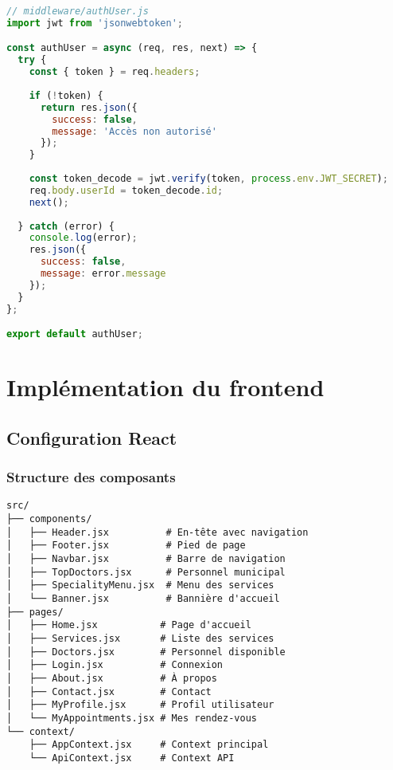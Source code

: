 \begin{lstlisting}[language=JavaScript, caption=Middleware d'authentification]
// middleware/authUser.js
import jwt from 'jsonwebtoken';

const authUser = async (req, res, next) => {
  try {
    const { token } = req.headers;
    
    if (!token) {
      return res.json({
        success: false,
        message: 'Accès non autorisé'
      });
    }
    
    const token_decode = jwt.verify(token, process.env.JWT_SECRET);
    req.body.userId = token_decode.id;
    next();
    
  } catch (error) {
    console.log(error);
    res.json({
      success: false,
      message: error.message
    });
  }
};

export default authUser;
\end{lstlisting}

\section{Implémentation du frontend}

\subsection{Configuration React}

\subsubsection{Structure des composants}

\begin{lstlisting}[caption=Structure des composants React]
src/
├── components/
│   ├── Header.jsx          # En-tête avec navigation
│   ├── Footer.jsx          # Pied de page
│   ├── Navbar.jsx          # Barre de navigation
│   ├── TopDoctors.jsx      # Personnel municipal
│   ├── SpecialityMenu.jsx  # Menu des services
│   └── Banner.jsx          # Bannière d'accueil
├── pages/
│   ├── Home.jsx           # Page d'accueil
│   ├── Services.jsx       # Liste des services
│   ├── Doctors.jsx        # Personnel disponible
│   ├── Login.jsx          # Connexion
│   ├── About.jsx          # À propos
│   ├── Contact.jsx        # Contact
│   ├── MyProfile.jsx      # Profil utilisateur
│   └── MyAppointments.jsx # Mes rendez-vous
└── context/
    ├── AppContext.jsx     # Context principal
    └── ApiContext.jsx     # Context API
\end{lstlisting}

